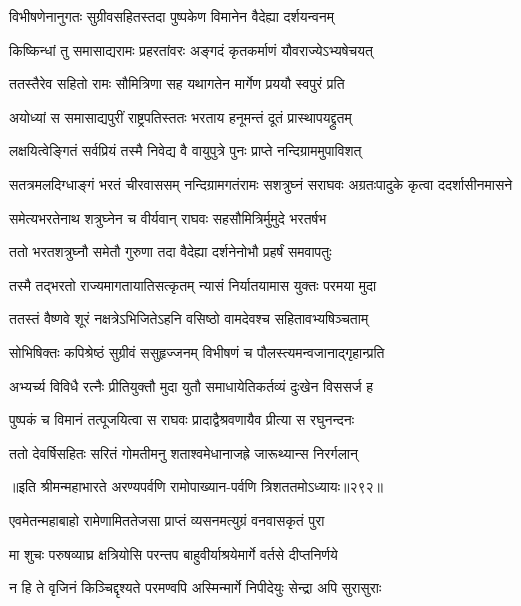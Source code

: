 \twolineshloka
{विभीषणेनानुगतः सुग्रीवसहितस्तदा}
{पुष्पकेण विमानेन वैदेह्या दर्शयन्वनम्}


\twolineshloka
{किष्किन्धां तु समासाद्यरामः प्रहरतांवरः}
{अङ्गदं कृतकर्माणं यौवराज्येऽभ्यषेचयत्}


\twolineshloka
{ततस्तैरेव सहितो रामः सौमित्रिणा सह}
{यथागतेन मार्गेण प्रययौ स्वपुरं प्रति}


\twolineshloka
{अयोध्यां स समासाद्यपुरीं राष्ट्रपतिस्ततः}
{भरताय हनूमन्तं दूतं प्रास्थापयद्द्रुतम्}


\twolineshloka
{लक्षयित्वेङ्गितं सर्वप्रियं तस्मै निवेद्य वै}
{वायुपुत्रे पुनः प्राप्ते नन्दिग्राममुपाविशत्}


\threelineshloka
{सतत्रमलदिग्धाङ्गं भरतं चीरवाससम्}
{नन्दिग्रामगतंरामः सशत्रुघ्नं सराघवः}
{अग्रतःपादुके कृत्वा ददर्शासीनमासने}


\twolineshloka
{समेत्यभरतेनाथ शत्रुघ्नेन च वीर्यवान्}
{राघवः सहसौमित्रिर्मुमुदे भरतर्षभ}


\twolineshloka
{ततो भरतशत्रुघ्नौ समेतौ गुरुणा तदा}
{वैदेह्या दर्शनेनोभौ प्रहर्षं समवापतुः}


\twolineshloka
{तस्मै तद्भरतो राज्यमागतायातिसत्कृतम्}
{न्यासं निर्यातयामास युक्तः परमया मुदा}


\twolineshloka
{ततस्तं वैष्णवे शूरं नक्षत्रेऽभिजितेऽहनि}
{वसिष्ठो वामदेवश्च सहितावभ्यषिञ्चताम्}


\twolineshloka
{सोभिषिक्तः कपिश्रेष्ठं सुग्रीवं ससुहृज्जनम्}
{विभीषणं च पौलस्त्यमन्वजानाद्गृहान्प्रति}


\twolineshloka
{अभ्यर्च्य विविधै रत्नैः प्रीतियुक्तौ मुदा युतौ}
{समाधायेतिकर्तव्यं दुःखेन विससर्ज ह}


\twolineshloka
{पुष्पकं च विमानं तत्पूजयित्वा स राघवः}
{प्रादाद्वैश्रवणायैव प्रीत्या स रघुनन्दनः}


\twolineshloka
{ततो देवर्षिसहितः सरितं गोमतीमनु}
{शताश्वमेधानाजह्रे जारूथ्यान्स निरर्गलान्}


॥इति श्रीमन्महाभारते अरण्यपर्वणि रामोपाख्यान-पर्वणि त्रिशततमोऽध्यायः॥२९२॥

\storymeta

\resetShloka



\twolineshloka
{एवमेतन्महाबाहो रामेणामिततेजसा}
{प्राप्तं व्यसनमत्युग्रं वनवासकृतं पुरा}


\twolineshloka
{मा शुचः परुषव्याघ्र क्षत्रियोसि परन्तप}
{बाहुवीर्याश्रयेमार्गे वर्तसे दीप्तनिर्णये}


\twolineshloka
{न हि ते वृजिनं किञ्चिद्दृश्यते परमण्वपि}
{अस्मिन्मार्गे निपीदेयुः सेन्द्रा अपि सुरासुराः}


